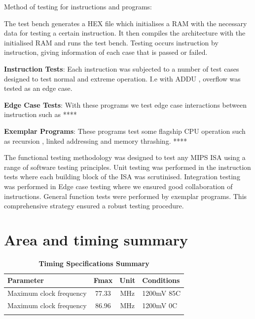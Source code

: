 \documentclass[10pt]{datasheet}
\begin{document}
Method of testing for instructions and programs:

The test bench generates a HEX file which initialises a RAM with the necessary data for testing a certain instruction. It then compiles the architecture with the initialised RAM and runs the test bench. Testing occurs instruction by instruction, giving information of each case that is passed or failed. 

\textbf{Instruction Tests}: Each instruction was subjected to a number of test cases designed to test normal and extreme operation. I.e with ADDU , overflow was tested as an edge case. 

\textbf{Edge Case Tests}: With these programs we test edge case interactions between instruction such as ****

\textbf{Exemplar Programs}: These programs test some flagship CPU operation such as recursion , linked addressing and memory thrashing. **** 

The functional testing methodology was designed to test any MIPS ISA using a range of software testing principles. Unit testing was performed in the instruction tests where each building block of the ISA was scrutinised. Integration testing was performed in Edge case testing where we ensured good collaboration of instructions. General function tests were performed by exemplar programs. This comprehensive strategy ensured a robust testing procedure.



\smallbreak



\onecolumn

\section{Area and timing summary}
\smallbreak

\begin{table}[h]
\caption{\textbf{Timing Specifications Summary } }
\begin{tabularx}{\textwidth}{l | c | c |  X}
    \thickhline
    \textbf{Parameter} &  \textbf{Fmax} & \textbf{Unit} & \textbf{Conditions} \\
    \hline
    Maximum clock frequency  & 77.33 & MHz & 1200mV 85C \\
     \hline
    Maximum clock frequency  & 86.96 & MHz & 1200mV 0C \\
    \thickhline
\end{tabularx}
\end{table}
\end{document}
